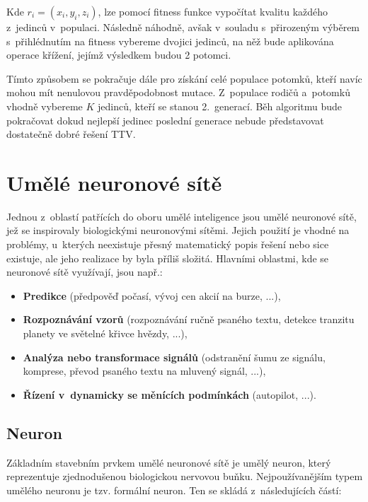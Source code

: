 \documentclass[a4paper,12pt]{article}
\begin{document}
{{{Kde $r_i = (x_i, y_i, z_i)$, lze pomocí fitness funkce vypočítat kvalitu každého z~jedinců v~populaci. Následně náhodně, avšak v~souladu s~přirozeným výběrem s~přihlédnutím na fitness vybereme dvojici jedinců, na něž bude aplikována operace křížení, jejímž výsledkem budou 2 potomci.~\cite{ttv}

Tímto způsobem se pokračuje dále pro získání celé populace potomků, kteří navíc mohou mít nenulovou pravděpodobnost mutace. Z~populace rodičů a~potomků vhodně vybereme $K$ jedinců, kteří se stanou 2.~generací. Běh algoritmu bude pokračovat dokud nejlepší jedinec poslední generace nebude představovat dostatečně dobré řešení TTV.

\drawgimp

\section{Umělé neuronové sítě}

Jednou z~oblastí patřících do oboru umělé inteligence jsou umělé neuronové sítě, jež se inspirovaly biologickými neuronovými sítěmi. Jejich použití je vhodné na problémy, u~kterých neexistuje přesný matematický popis řešení nebo sice existuje, ale jeho realizace by byla příliš složitá. Hlavními oblastmi, kde se neuronové sítě využívají, jsou např.:

\begin{itemize}
\item \textbf{Predikce} (předpověď počasí,  vývoj cen akcií na burze, ...),

\item \textbf{Rozpoznávání vzorů} (rozpoznávání ručně psaného textu, detekce tranzitu planety ve světelné křivce hvězdy, ...),

\item \textbf{Analýza nebo transformace signálů} (odstranění šumu ze signálu, komprese, převod psaného textu na mluvený signál, ...),

\item \textbf{Řízení v~dynamicky se měnících podmínkách} (autopilot, ...).~\cite{nn}

\end{itemize}

\subsection{Neuron}

Základním stavebním prvkem umělé neuronové sítě je umělý neuron, který reprezentuje zjednodušenou biologickou nervovou buňku. Nejpoužívanějším typem umělého neuronu je tzv. formální neuron. Ten se skládá z~následujících částí:

}}}
\end{document}
